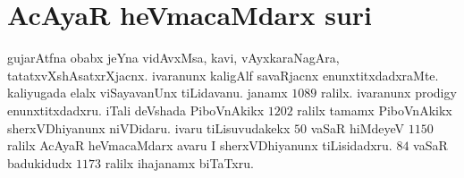 \section*{AcAyaR heVmacaMdarx suri}
gujarAtfna obabx jeYna vidAvxMsa, kavi, vAyxkaraNagAra, tatatxvXshAsatxrXjacnx. ivaranunx kaligAlf savaRjacnx enunxtitxdadxraMte. kaliyugada elalx viSayavanUnx tiLidavanu. janamx $1089$ ralilx. ivaranunx {\rm prodigy} enunxtitxdadxru. iTali deVshada PiboVnAkikx $1202$ ralilx  tamamx PiboVnAkikx sherxVDhiyanunx niVDidaru. ivaru tiLisuvudakekx $50$ vaSaR hiMdeyeV $1150$ ralilx AcAyaR heVmacaMdarx avaru I sherxVDhiyanunx tiLisidadxru. $84$ vaSaR badukidudx $1173$ ralilx ihajanamx biTaTxru.
